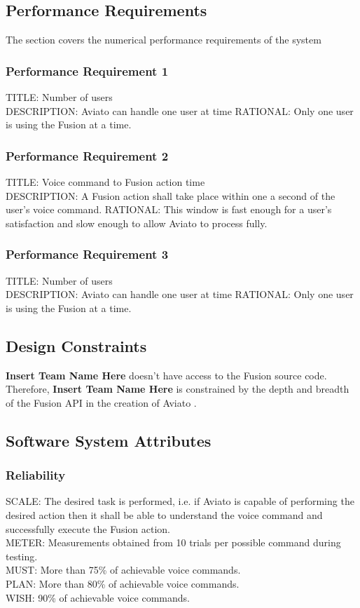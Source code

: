 \documentclass[onecolumn, draftclsnofoot,10pt, compsoc]{IEEEtran}
\def \CapstoneTeamName{\textbf{Insert Team Name Here} }
\def \botname{Aviato }
\begin{document}
   		 \subsection{Performance Requirements}
    		The section covers the numerical performance requirements of the system
        
        \subsubsection{Performance Requirement 1}
        TITLE: Number  of users \\
        DESCRIPTION: \botname can handle one user at time
        RATIONAL: Only one user is using the Fusion at a time. 
        
        \subsubsection{Performance Requirement 2}
        TITLE: Voice command to Fusion action time \\
        DESCRIPTION: A Fusion action shall take place within one a second of the user's voice command.
        RATIONAL: This window is fast enough for a user's satisfaction and slow enough to allow \botname to process fully.
        
        \subsubsection{Performance Requirement 3}
        TITLE: Number  of users \\
        DESCRIPTION: \botname can handle one user at time
        RATIONAL: Only one user is using the Fusion at a time. 
        
    \subsection{Design Constraints}
    	\CapstoneTeamName doesn't have access to the Fusion source code. Therefore, \CapstoneTeamName is constrained by the depth and breadth of the Fusion API in the creation of \botname.
        
    \subsection{Software System Attributes}
	   	\subsubsection{Reliability}
	   	SCALE: The desired task is performed, i.e. if \botname is capable of performing the desired action then it shall be able to understand the voice command and successfully execute the Fusion action.\\
	   	METER: Measurements obtained from 10 trials per possible command during testing.\\
	   	MUST: More than 75\% of achievable voice commands.\\
	   	PLAN: More than 80\% of achievable voice commands.\\
	   	WISH: 90\% of achievable voice commands.\\
   
\end{document}

